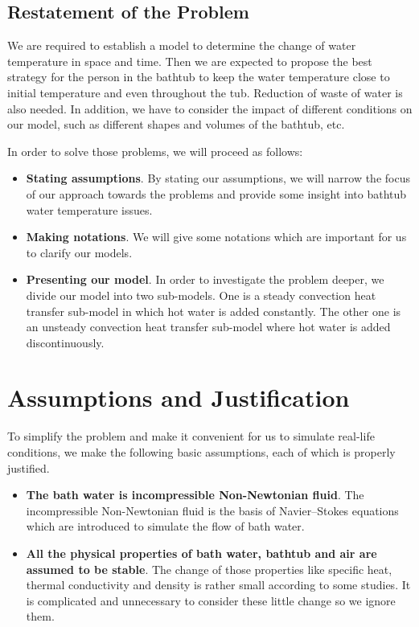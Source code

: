 \documentclass{mcmthesis}
\begin{document}
\subsection{Restatement of the Problem}

We are required to establish a model to determine the change of water temperature
in space and time. Then we are expected to propose the best strategy for the
person in the bathtub to keep the water temperature close to initial temperature
and even throughout the tub. Reduction of waste of water is also needed. In
addition, we have to consider the impact of different conditions on our model,
such as different shapes and volumes of the bathtub, etc.

In order to solve those problems, we will proceed as follows:

\begin{itemize}
    \item {\bf Stating assumptions}. By stating our assumptions, we will narrow the
          focus of our approach towards the problems and provide some insight into bathtub
          water temperature issues.

    \item {\bf Making notations}. We will give some notations which are important for
          us to clarify our models.

    \item {\bf Presenting our model}. In order to investigate the problem deeper, we
          divide our model into two sub-models. One is a steady convection heat transfer
          sub-model in which hot water is added constantly. The other one is an unsteady
          convection heat transfer sub-model where hot water is added discontinuously.



\end{itemize}

\section{Assumptions and Justification}

To simplify the problem and make it convenient for us to simulate real-life
conditions, we make the following basic assumptions, each of which is properly
justified.

\begin{itemize}
    \item {\bf The bath water is incompressible Non-Newtonian fluid}. The
          incompressible Non-Newtonian fluid is the basis of Navier–Stokes equations
          which are introduced to simulate the flow of bath water.

    \item {\bf All the physical properties of bath water, bathtub and air are
          assumed to be stable}. The change of those properties like specific heat,
          thermal conductivity and density is rather small according to some
          studies. It is complicated and unnecessary to consider these little
          change so we ignore them.


\end{itemize}
\end{document}
